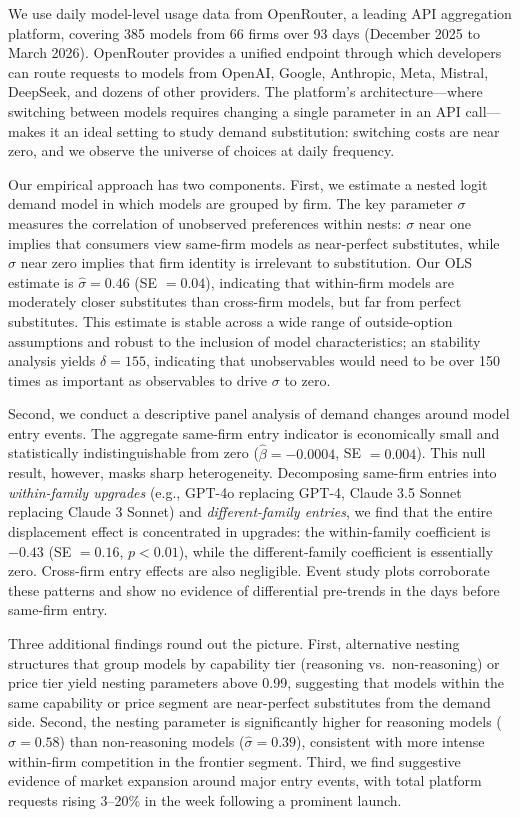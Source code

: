 \documentclass[11pt, a4paper]{article}
\begin{document}
We use daily model-level usage data from OpenRouter, a leading API aggregation platform, covering 385 models from 66 firms over 93 days (December 2025 to March 2026). OpenRouter provides a unified endpoint through which developers can route requests to models from OpenAI, Google, Anthropic, Meta, Mistral, DeepSeek, and dozens of other providers. The platform's architecture---where switching between models requires changing a single parameter in an API call---makes it an ideal setting to study demand substitution: switching costs are near zero, and we observe the universe of choices at daily frequency.

Our empirical approach has two components. First, we estimate a nested logit demand model \citep{berry1994estimating, mcfadden1978modelling} in which models are grouped by firm. The key parameter $\sigma$ measures the correlation of unobserved preferences within nests: $\sigma$ near one implies that consumers view same-firm models as near-perfect substitutes, while $\sigma$ near zero implies that firm identity is irrelevant to substitution. Our OLS estimate is $\hat{\sigma} = 0.46$ (SE $= 0.04$), indicating that within-firm models are moderately closer substitutes than cross-firm models, but far from perfect substitutes. This estimate is stable across a wide range of outside-option assumptions and robust to the inclusion of model characteristics; an \citet{oster2019unobservable} stability analysis yields $\delta = 155$, indicating that unobservables would need to be over 150 times as important as observables to drive $\sigma$ to zero.

Second, we conduct a descriptive panel analysis of demand changes around model entry events. The aggregate same-firm entry indicator is economically small and statistically indistinguishable from zero ($\hat{\beta} = -0.0004$, SE $= 0.004$). This null result, however, masks sharp heterogeneity. Decomposing same-firm entries into \emph{within-family upgrades} (e.g., GPT-4o replacing GPT-4, Claude 3.5 Sonnet replacing Claude 3 Sonnet) and \emph{different-family entries}, we find that the entire displacement effect is concentrated in upgrades: the within-family coefficient is $-0.43$ (SE $= 0.16$, $p < 0.01$), while the different-family coefficient is essentially zero. Cross-firm entry effects are also negligible. Event study plots corroborate these patterns and show no evidence of differential pre-trends in the days before same-firm entry.

Three additional findings round out the picture. First, alternative nesting structures that group models by capability tier (reasoning vs.\ non-reasoning) or price tier yield nesting parameters above 0.99, suggesting that models within the same capability or price segment are near-perfect substitutes from the demand side. Second, the nesting parameter is significantly higher for reasoning models ($\hat{\sigma} = 0.58$) than non-reasoning models ($\hat{\sigma} = 0.39$), consistent with more intense within-firm competition in the frontier segment. Third, we find suggestive evidence of market expansion around major entry events, with total platform requests rising 3--20\% in the week following a prominent launch.
\end{document}
